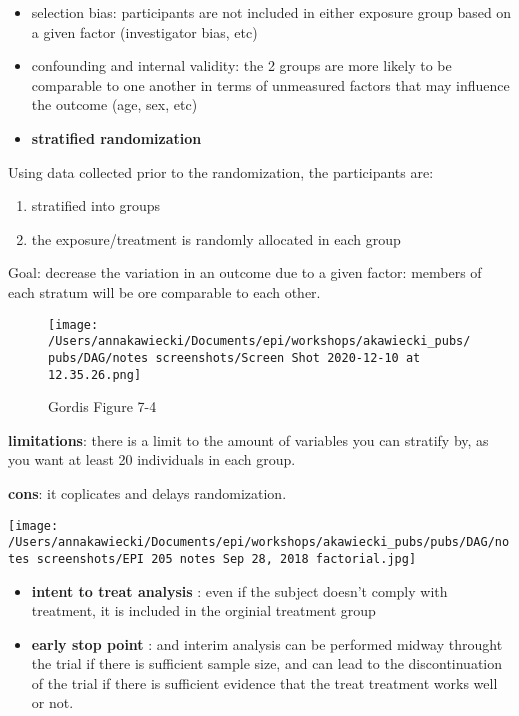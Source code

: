 \documentclass[
]{article}
\providecommand{\tightlist}{%
  \setlength{\itemsep}{0pt}\setlength{\parskip}{0pt}}
\begin{document}
\begin{itemize}
\item
  selection bias: participants are not included in either exposure group
  based on a given factor (investigator bias, etc)
\item
  confounding and internal validity: the 2 groups are more likely to be
  comparable to one another in terms of unmeasured factors that may
  influence the outcome (age, sex, etc)
\item
  \textbf{stratified randomization}
\end{itemize}

Using data collected prior to the randomization, the participants are:

\begin{enumerate}
\def\labelenumi{\arabic{enumi}.}
\tightlist
\item
  stratified into groups
\item
  the exposure/treatment is randomly allocated in each group
\end{enumerate}

Goal: decrease the variation in an outcome due to a given factor:
members of each stratum will be ore comparable to each other.

\begin{figure}
\centering
\texttt{[image: /Users/annakawiecki/Documents/epi/workshops/akawiecki\_pubs/pubs/DAG/notes screenshots/Screen Shot 2020-12-10 at 12.35.26.png]}
\caption{Gordis Figure 7-4}
\end{figure}

\textbf{limitations}: there is a limit to the amount of variables you
can stratify by, as you want at least 20 individuals in each group.

\textbf{cons}: it coplicates and delays randomization.

\texttt{[image: /Users/annakawiecki/Documents/epi/workshops/akawiecki\_pubs/pubs/DAG/notes screenshots/EPI 205 notes Sep 28, 2018 factorial.jpg]}

\begin{itemize}
\item
  \textbf{intent to treat analysis} : even if the subject doesn't comply
  with treatment, it is included in the orginial treatment group
\item
  \textbf{early stop point} : and interim analysis can be performed
  midway throught the trial if there is sufficient sample size, and can
  lead to the discontinuation of the trial if there is sufficient
  evidence that the treat treatment works well or not.
\end{itemize}
\end{document}
